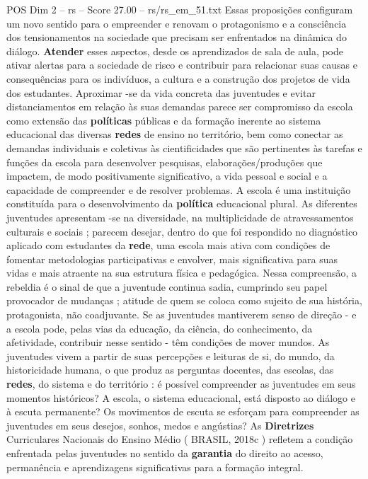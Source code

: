 \begin{textsample}{POS Dim 2 – rs – Score 27.00 – rs/rs\_em\_51.txt}
Essas proposições configuram um novo sentido para o empreender e renovam o protagonismo e a consciência dos tensionamentos na sociedade que precisam ser enfrentados na dinâmica do diálogo. \textbf{Atender} esses aspectos, desde os aprendizados de sala de aula, pode ativar alertas para a sociedade de risco e contribuir para relacionar suas causas e consequências para os indivíduos, a cultura e a construção dos projetos de vida dos estudantes.
Aproximar -se da vida concreta das juventudes e evitar distanciamentos em relação às suas demandas parece ser compromisso da escola como extensão das \textbf{políticas} públicas e da formação inerente ao sistema educacional das diversas \textbf{redes} de ensino no território, bem como conectar as demandas individuais e coletivas às cientificidades que são pertinentes às tarefas e funções da escola para desenvolver pesquisas, elaborações/produções que impactem, de modo positivamente significativo, a vida pessoal e social e a capacidade de compreender e de resolver problemas.
A escola é uma instituição constituída para o desenvolvimento da \textbf{política} educacional plural.
As diferentes juventudes apresentam -se na diversidade, na multiplicidade de atravessamentos culturais e sociais ; parecem desejar, dentro do que foi respondido no diagnóstico aplicado com estudantes da \textbf{rede}, uma escola mais ativa com condições de fomentar metodologias participativas e envolver, mais significativa para suas vidas e mais atraente na sua estrutura física e pedagógica.
Nessa compreensão, a rebeldia é o sinal de que a juventude continua sadia, cumprindo seu papel provocador de mudanças ; atitude de quem se coloca como sujeito de sua história, protagonista, não coadjuvante.
Se as juventudes mantiverem senso de direção - e a escola pode, pelas vias da educação, da ciência, do conhecimento, da afetividade, contribuir nesse sentido - têm condições de mover mundos.
As juventudes vivem a partir de suas percepções e leituras de si, do mundo, da historicidade humana, o que produz as perguntas docentes, das escolas, das \textbf{redes}, do sistema e do território : é possível compreender as juventudes em seus momentos históricos?
A escola, o sistema educacional, está disposto ao diálogo e à escuta permanente?
Os movimentos de escuta se esforçam para compreender as juventudes em seus desejos, sonhos, medos e angústias?
As \textbf{Diretrizes} Curriculares Nacionais do Ensino Médio ( BRASIL, 2018c ) refletem a condição enfrentada pelas juventudes no sentido da \textbf{garantia} do direito ao acesso, permanência e aprendizagens significativas para a formação integral.

\end{textsample}

